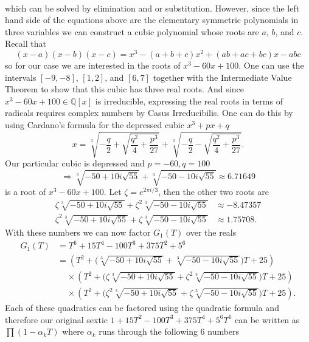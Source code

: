 \documentclass[10pt,oneside,reqno]{amsart}
\begin{document}
\begin{flushleft}
\begin{align*}
		\end{align*}
		which can be solved by elimination and or substitution.  However, since the left hand side of the equations above are the elementary symmetric polynomials in three variables we can construct a cubic polynomial whose roots are $a$, $b$, and $c$.  Recall that
		\begin{equation*}
			(x-a)(x-b)(x-c)=x^3-(a+b+c)x^2+(ab+ac+bc)x-abc
		\end{equation*}
		so for our case we are interested in the roots of $x^3-60x+100$.  One can use the intervals $[-9,-8]$, $[1,2]$, and $[6,7]$ together with the Intermediate Value Theorem to show that this cubic has three real roots.  And since $x^3-60x+100\in\mathbb{Q}[x]$ is irreducible, expressing the real roots in terms of radicals requires complex numbers by Casus Irreducibilis.  One can do this by using Cardano's formula for the depressed cubic $x^3+px+q$
		\begin{equation*}
			x=\sqrt[3]{-\frac{q}{2}+\sqrt{\frac{q^2}{4}+\frac{p^3}{27}}}+\sqrt[3]{-\frac{q}{2}-\sqrt{\frac{q^2}{4}+\frac{p^3}{27}}}.
		\end{equation*}
		Our particular cubic is depressed and $p=-60,q=100$
		\begin{equation*}
			\Rightarrow \sqrt[3]{-50+10i\sqrt{55}}+\sqrt[3]{-50-10i\sqrt{55}}\approx 6.71649
		\end{equation*}
		is a root of $x^3-60x+100$.  Let $\zeta=e^{2\pi i/3}$, then the other two roots are
		\begin{align*}
			\zeta\sqrt[3]{-50+10i\sqrt{55}}+\zeta^2\sqrt[3]{-50-10i\sqrt{55}} & \approx -8.47357\\
			\zeta^2\sqrt[3]{-50+10i\sqrt{55}}+\zeta\sqrt[3]{-50-10i\sqrt{55}} & \approx 1.75708.
		\end{align*}
		With these numbers we can now factor $G_1(T)$ over the reals
		\begin{align*}
			G_1(T) & =T^6+15T^4-100T^3+375T^2+5^6 \\
			& =(T^2+\Big(\sqrt[3]{-50+10i\sqrt{55}}+\sqrt[3]{-50-10i\sqrt{55}}\Big)T+25) \\
			& \;\;\;\;\times(T^2+\Big(\zeta\sqrt[3]{-50+10i\sqrt{55}}+\zeta^2\sqrt[3]{-50-10i\sqrt{55}}\Big)T+25) \\
			& \;\;\;\;\times(T^2+\Big(\zeta^2\sqrt[3]{-50+10i\sqrt{55}}+\zeta\sqrt[3]{-50-10i\sqrt{55}}\Big)T+25).
		\end{align*}
		Each of these quadratics can be factored using the quadratic formula and therefore our original sextic $1+15T^2-100T^3+375T^4+5^6T^6$ can be written as $\prod(1-\alpha_kT)$ where $\alpha_k$ runs through the following 6 numbers

\end{flushleft}
\end{document}
